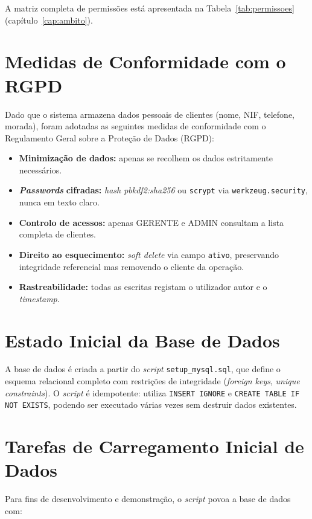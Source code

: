 \documentclass[11pt,a4paper]{report}
\begin{document}
A matriz completa de permissões está apresentada na Tabela~\ref{tab:permissoes} (capítulo~\ref{cap:ambito}).

\section{Medidas de Conformidade com o RGPD}
Dado que o sistema armazena dados pessoais de clientes (nome, NIF, telefone, morada), foram adotadas as seguintes medidas de conformidade com o Regulamento Geral sobre a Proteção de Dados (RGPD):

\begin{itemize}
  \item \textbf{Minimização de dados:} apenas se recolhem os dados estritamente necessários.
  \item \textit{\textbf{Passwords}} \textbf{cifradas:} \textit{hash pbkdf2:sha256} ou \texttt{scrypt} via \texttt{werkzeug.security}, nunca em texto claro.
  \item \textbf{Controlo de acessos:} apenas GERENTE e ADMIN consultam a lista completa de clientes.
  \item \textbf{Direito ao esquecimento:} \textit{soft delete} via campo \texttt{ativo}, preservando integridade referencial mas removendo o cliente da operação.
  \item \textbf{Rastreabilidade:} todas as escritas registam o utilizador autor e o \textit{timestamp}.
\end{itemize}

\section{Estado Inicial da Base de Dados}
A base de dados é criada a partir do \textit{script} \texttt{setup\_mysql.sql}, que define o esquema relacional completo com restrições de integridade (\textit{foreign keys}, \textit{unique constraints}). O \textit{script} é idempotente: utiliza \texttt{INSERT IGNORE} e \texttt{CREATE TABLE IF NOT EXISTS}, podendo ser executado várias vezes sem destruir dados existentes.

\section{Tarefas de Carregamento Inicial de Dados}
Para fins de desenvolvimento e demonstração, o \textit{script} povoa a base de dados com:
\end{document}
